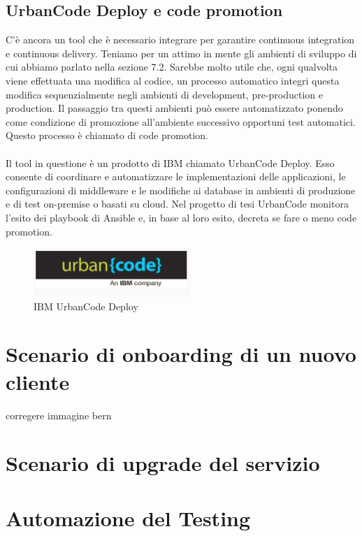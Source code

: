 \subsection{UrbanCode Deploy e code promotion}
C'è ancora un tool che è necessario integrare per garantire continuous integration e continuous delivery. Teniamo per un attimo in mente gli ambienti di sviluppo di cui abbiamo parlato nella sezione 7.2. Sarebbe molto utile che, ogni qualvolta viene effettuata una modifica al codice, un processo automatico integri questa modifica sequenzialmente negli ambienti di development, pre-production e production. Il passaggio tra questi ambienti può essere automatizzato ponendo come condizione di promozione all'ambiente successivo opportuni test automatici. Questo processo è chiamato di code promotion. 
\paragraph{}
Il tool in questione è un prodotto di IBM chiamato UrbanCode Deploy. Esso consente di coordinare e automatizzare le implementazioni delle applicazioni, le configurazioni di middleware e le modifiche ai database in ambienti di produzione e di test on-premise o basati su cloud. Nel progetto di tesi UrbanCode monitora l'esito dei playbook di Ansible e, in base al loro esito, decreta se fare o meno code promotion.
\begin{figure}
	\centering
	\includegraphics[width=0.7\linewidth]{capitoli/imgs/ucd}
	\caption{IBM UrbanCode Deploy}
	\label{fig:ucd}
\end{figure}

\section{Scenario di onboarding di un nuovo cliente}
corregere immagine bern
\section{Scenario di upgrade del servizio}

\section{Automazione del Testing}
